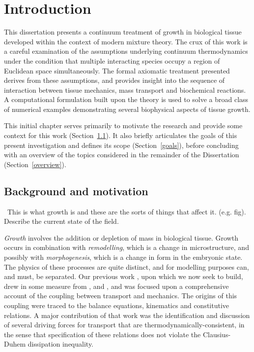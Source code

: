 \chapter{Introduction}
\label{introduction}

This dissertation presents a continuum treatment of growth in
biological tissue developed within the context of modern mixture
theory. The crux of this work is a careful examination of the
assumptions underlying continuum thermodynamics under the condition
that multiple interacting species occupy a region of Euclidean space
simultaneously. The formal axiomatic treatment presented derives from
these assumptions, and provides insight into the sequence of
interaction between tissue mechanics, mass transport and biochemical
reactions. A computational formulation built upon the theory is used
to solve a broad class of numerical examples demonstrating several
biophysical aspects of tissue growth.

This initial chapter serves primarily to motivate the research and
provide some context for this work (Section~\ref{background}). It also
briefly articulates the goals of this present investigation and
defines its scope (Section~\ref{goals}), before concluding with an
overview of the topics considered in the remainder of the Dissertation
(Section~\ref{overview}).

\section{Background and motivation}
\label{background}

\textbullet\ This is what growth is and these are the sorts of things
that affect it. (e.g. fig). Describe the current state of the field.

\emph{Growth} involves the addition or depletion of mass in biological
tissue. Growth occurs in combination with
\emph{remodelling}, which is a change in microstructure, and possibly
with \emph{morphogenesis}, which is a change in form in the embryonic
state. The physics of these processes are quite distinct, and for
modelling purposes can, and must, be separated. Our previous work
\citep{growthpaper}, upon which we now seek to build, drew in some
measure from \citet{CowinHegedus:76, EpsteinMaugin:2000}, and
\citet{TaberHumphrey:2001}, and was focused upon a comprehensive
account of the coupling between transport and mechanics. The origins
of this coupling were traced to the balance equations, kinematics and
constitutive relations. A major contribution of that work was the
identification and discussion of several driving forces for transport
that are thermodynamically-consistent, in the sense that specification
of these relations does not violate the Clausius-Duhem dissipation
inequality. 

